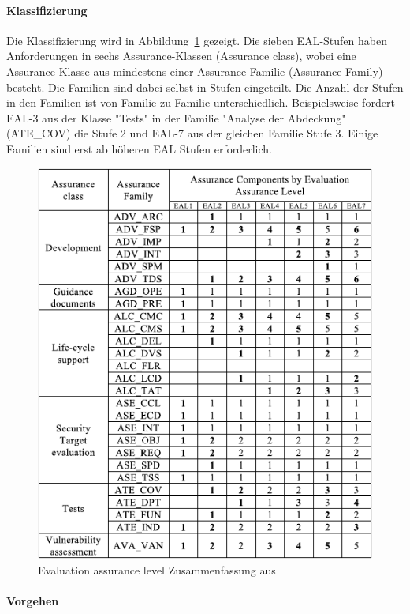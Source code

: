 \documentclass[11pt,a4paper]{report}
\begin{document}
\paragraph{Klassifizierung}

Die Klassifizierung wird in Abbildung~\ref{fig:eal_sum} gezeigt. Die sieben EAL-Stufen haben Anforderungen in sechs Assurance-Klassen (Assurance class), wobei eine Assurance-Klasse aus mindestens einer Assurance-Familie (Assurance Family) besteht. Die Familien sind dabei selbst in Stufen eingeteilt. Die Anzahl der Stufen in den Familien ist von Familie zu Familie unterschiedlich. Beispielsweise fordert EAL-3 aus der Klasse "Tests" in der Familie "Analyse der Abdeckung" (ATE\_COV) die Stufe 2 und EAL-7 aus der gleichen Familie Stufe 3. Einige Familien sind erst ab höheren EAL Stufen erforderlich. 

\begin{figure}[htb]
\centering
\includegraphics[scale=1.2]{images/cc_eal_table.pdf}
\caption[]{Evaluation assurance level Zusammenfassung aus \cite{bsi_ccguide}}
\label{fig:eal_sum}
\end{figure}

\paragraph{Vorgehen}
\end{document}
